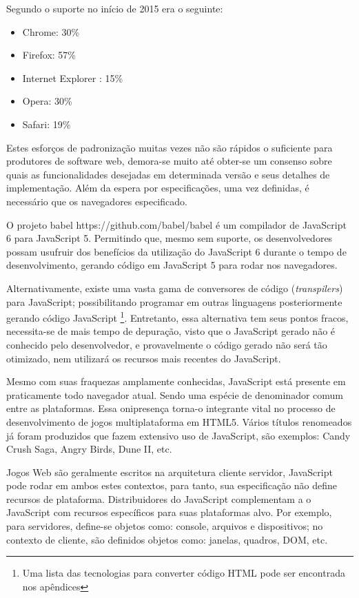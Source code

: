 Segundo \cite{ecmaSupport} o suporte no início de 2015 era o seguinte:

\begin{itemize}
    \item Chrome: 30\%
    \item Firefox: 57\%
    \item Internet Explorer : 15\%
    \item Opera: 30\%
    \item Safari: 19\%
\end{itemize}

Estes esforços de padronização muitas vezes não são rápidos
o suficiente para produtores de software web, demora-se muito até
obter-se um consenso sobre quais as funcionalidades desejadas em
determinada versão e seus detalhes de implementação. Além da
espera por especificações, uma vez definidas, é necessário que os
navegadores especificado.

O projeto babel https://github.com/babel/babel é um compilador de
JavaScript 6 para JavaScript 5. Permitindo que, mesmo sem suporte, os
desenvolvedores possam usufruir dos benefícios da utilização do
JavaScript 6 durante o tempo de desenvolvimento, gerando código em
JavaScript 5 para rodar nos navegadores.

Alternativamente, existe uma vasta gama de conversores de código
(\textit{transpilers}) para JavaScript; possibilitando programar
em outras linguagens posteriormente gerando código JavaScript
\footnote{Uma lista das tecnologias para converter código HTML pode ser encontrada nos apêndices}.
Entretanto, essa alternativa tem seus pontos fracos, necessita-se
de mais tempo de depuração, visto que o JavaScript gerado não é
conhecido pelo desenvolvedor, e provavelmente o código gerado não
será tão otimizado, nem utilizará os recursos mais recentes do
JavaScript.

Mesmo com suas fraquezas amplamente conhecidas, JavaScript está
presente em praticamente todo navegador atual. Sendo uma espécie de
denominador comum entre as plataformas. Essa onipresença torna-o
integrante vital no processo de desenvolvimento de jogos multiplataforma
em HTML5. Vários títulos renomeados já foram produzidos que fazem
extensivo uso de JavaScript, são exemplos: Candy Crush Saga, Angry
Birds, Dune II, etc.

Jogos Web são geralmente escritos na arquitetura cliente servidor,
JavaScript pode rodar em ambos estes contextos, para tanto, sua
especificação não define recursos de plataforma. Distribuidores do
JavaScript complementam a o JavaScript com recursos específicos para
suas plataformas alvo. Por exemplo, para servidores, define-se objetos como:
console, arquivos e dispositivos; no contexto de cliente,
são definidos objetos como: janelas, quadros, DOM, etc.

